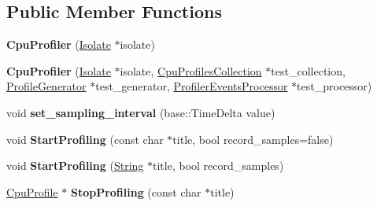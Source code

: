 \subsection*{Public Member Functions}
\begin{DoxyCompactItemize}
\item 
\hypertarget{classv8_1_1internal_1_1_cpu_profiler_a58e54bb45700330634856222e2f1dffd}{}{\bfseries Cpu\+Profiler} (\hyperlink{classv8_1_1internal_1_1_isolate}{Isolate} $\ast$isolate)\label{classv8_1_1internal_1_1_cpu_profiler_a58e54bb45700330634856222e2f1dffd}

\item 
\hypertarget{classv8_1_1internal_1_1_cpu_profiler_ae40aa7336ead1bb03ccd469b2fcc22ab}{}{\bfseries Cpu\+Profiler} (\hyperlink{classv8_1_1internal_1_1_isolate}{Isolate} $\ast$isolate, \hyperlink{classv8_1_1internal_1_1_cpu_profiles_collection}{Cpu\+Profiles\+Collection} $\ast$test\+\_\+collection, \hyperlink{classv8_1_1internal_1_1_profile_generator}{Profile\+Generator} $\ast$test\+\_\+generator, \hyperlink{classv8_1_1internal_1_1_profiler_events_processor}{Profiler\+Events\+Processor} $\ast$test\+\_\+processor)\label{classv8_1_1internal_1_1_cpu_profiler_ae40aa7336ead1bb03ccd469b2fcc22ab}

\item 
\hypertarget{classv8_1_1internal_1_1_cpu_profiler_a967c226a0cbbcd9244269645ad3a1c0d}{}void {\bfseries set\+\_\+sampling\+\_\+interval} (base\+::\+Time\+Delta value)\label{classv8_1_1internal_1_1_cpu_profiler_a967c226a0cbbcd9244269645ad3a1c0d}

\item 
\hypertarget{classv8_1_1internal_1_1_cpu_profiler_a07966800ae6687084824875b3083260f}{}void {\bfseries Start\+Profiling} (const char $\ast$title, bool record\+\_\+samples=false)\label{classv8_1_1internal_1_1_cpu_profiler_a07966800ae6687084824875b3083260f}

\item 
\hypertarget{classv8_1_1internal_1_1_cpu_profiler_ace77f1bf133803efcd8925e3891c5bec}{}void {\bfseries Start\+Profiling} (\hyperlink{classv8_1_1internal_1_1_string}{String} $\ast$title, bool record\+\_\+samples)\label{classv8_1_1internal_1_1_cpu_profiler_ace77f1bf133803efcd8925e3891c5bec}

\item 
\hypertarget{classv8_1_1internal_1_1_cpu_profiler_a1ce853fee2c3e8959ac78d2c8af24ac1}{}\hyperlink{classv8_1_1internal_1_1_cpu_profile}{Cpu\+Profile} $\ast$ {\bfseries Stop\+Profiling} (const char $\ast$title)\label{classv8_1_1internal_1_1_cpu_profiler_a1ce853fee2c3e8959ac78d2c8af24ac1}


\end{DoxyCompactItemize}
